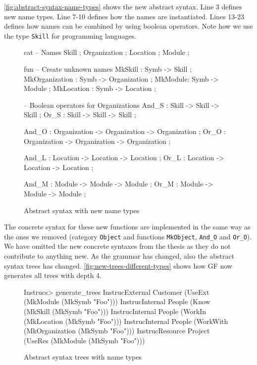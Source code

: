 \autoref{fig:abstract-syntax-name-types} shows the new abstract syntax. Line 3 defines new name types. Line 7-10 defines how the names are instantiated. Lines 13-23 defines how names can be combined by using boolean operators. Note how we use the type \texttt{Skill} for programming languages.

\begin{figure}[H]
\begin{code}
cat
  -- Names
  Skill ; Organization ; Location ; Module ;
  
fun
  -- Create unknown names
  MkSkill : Symb -> Skill ;
  MkOrganization : Symb -> Organization ;
  MkModule: Symb -> Module ;
  MkLocation : Symb -> Location ;
  
  -- Boolean operators for Organizations
  And_S : Skill -> Skill -> Skill ;
  Or_S : Skill -> Skill -> Skill ;

  And_O : Organization -> Organization -> Organization ;
  Or_O : Organization -> Organization -> Organization ;

  And_L : Location -> Location -> Location ;
  Or_L : Location -> Location -> Location ;

  And_M : Module -> Module -> Module ;
  Or_M : Module -> Module -> Module ;
\end{code}
\caption{Abstract syntax with new name types\label{fig:abstract-syntax-name-types}}
\end{figure}

The concrete syntax for these new functions are implemented in the same way as the ones we removed (category \texttt{Object} and functions \texttt{MkObject}, \texttt{And\_O} and \texttt{Or\_O}). We have omitted the new concrete syntaxes from the thesis as they do not contribute to anything new.
\newline
\newline
As the grammar has changed, also the abstract syntax trees has changed. \autoref{fig:new-trees-different-types} shows how GF now generates all trees with depth 4.
\begin{figure}[H]
\begin{terminal}
Instrucs> generate_trees
InstrucExternal Customer (UseExt (MkModule (MkSymb "Foo")))
InstrucInternal People (Know (MkSkill (MkSymb "Foo")))
InstrucInternal People (WorkIn (MkLocation (MkSymb "Foo")))
InstrucInternal People (WorkWith (MkOrganization (MkSymb "Foo")))
InstrucResource Project (UseRes (MkModule (MkSymb "Foo")))

\end{terminal}
\caption{Abstract syntax trees with name types\label{fig:new-trees-different-types}}
\end{figure}

